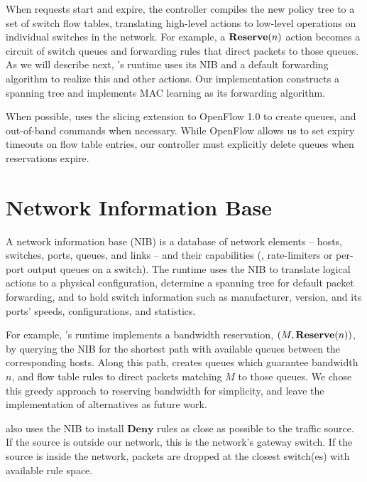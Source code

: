 When requests start and expire, the \sys controller compiles the new
policy tree to a set of switch flow tables, translating
high-level actions to low-level operations on individual
switches in the network. For example, a $\textbf{Reserve}(n)$ action
becomes a circuit of switch queues and forwarding rules that direct
packets to those queues.  As we will describe next, \sys's runtime
uses its NIB and a default forwarding algorithm to realize this and
other actions.  Our implementation constructs a spanning tree and
implements MAC learning as its forwarding algorithm.

When possible, \sys uses the slicing extension to OpenFlow 1.0 to
create queues, and out-of-band commands when necessary.  While
OpenFlow allows us to set expiry timeouts on flow table entries, our
controller must explicitly delete queues when reservations expire.



\section{Network Information Base}
\label{sec:NIB}

A network information base (NIB) is a database of network elements
-- hosts, switches, ports, queues, and links -- and their
capabilities (\eg, rate-limiters or per-port output queues on a
switch). The runtime uses the NIB to translate logical actions to a
physical configuration, determine a spanning tree for default packet
forwarding, and to hold switch information such as manufacturer,
version, and its ports' speeds, configurations, and statistics.

For example, \sys's runtime implements a bandwidth reservation,
$(M,\textbf{Reserve}(n))$, by querying the NIB for the shortest path
with available queues between the corresponding hosts.  Along this
path, \sys creates queues which guarantee bandwidth $n$, and flow
table rules to direct packets matching $M$ to those queues. We chose
this greedy approach to reserving bandwidth for simplicity, and
leave the implementation of alternatives as future work.

\sys also uses the NIB to install $\textbf{Deny}$ rules as close as
possible to the traffic source. If the source is outside our
network, this is the network's gateway switch. If the source is
inside the network, packets are dropped at the closest switch(es)
with available rule space.

